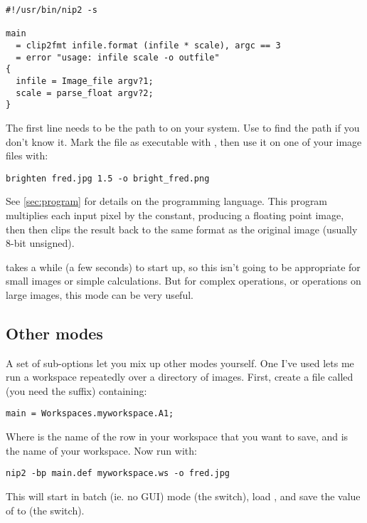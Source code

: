 \begin{verbatim}
#!/usr/bin/nip2 -s

main
  = clip2fmt infile.format (infile * scale), argc == 3
  = error "usage: infile scale -o outfile"
{
  infile = Image_file argv?1;
  scale = parse_float argv?2;
}
\end{verbatim}

\noindent
The first line needs to be the path to \nip{} on your system. Use  to find the path if you don't know it. Mark the file as executable with
, then use it on one of your image files with:

\begin{verbatim}
brighten fred.jpg 1.5 -o bright_fred.png
\end{verbatim}

\noindent
See \cref{sec:program} for details on the programming language. This program
multiplies each input pixel by the constant, producing a floating point image,
then then clips the result back to the same format as the original image
(usually 8-bit unsigned).

\nip{} takes a while (a few seconds) to start up, so this isn't going to be
appropriate for small images or simple calculations. But for complex
operations, or operations on large images, this mode can be very useful.

\subsection{Other modes}

A set of sub-options let you mix up other modes yourself. One I've used lets
me run a workspace repeatedly over a directory of images. First, create a file
called  (you need the  suffix) containing:

\begin{verbatim}
main = Workspaces.myworkspace.A1;
\end{verbatim}

\noindent
Where  is the name of the row in your workspace that you want to save,
and  is the name of your workspace. Now run \nip{} with:

\begin{verbatim}
nip2 -bp main.def myworkspace.ws -o fred.jpg
\end{verbatim}

\noindent
This will start \nip{} in batch (ie. no GUI) mode (the  switch), 
load , and save the value of  to  (the
 switch).

